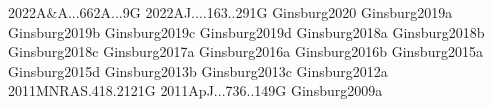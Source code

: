 \documentclass{article}
\begin{document}






















%



%

%
%
%
%
%
%
%
%
%
%
%
%
%
%
%
%
%
%
%








%

%




\nocite{biba}{2022A&A...662A...9G}
\nocite{biba}{2022AJ....163..291G}
\nocite{biba}{Ginsburg2020}
\nocite{biba}{Ginsburg2019a}
\nocite{biba}{Ginsburg2019b}
\nocite{biba}{Ginsburg2019c}
\nocite{biba}{Ginsburg2019d}
\nocite{biba}{Ginsburg2018a}
\nocite{biba}{Ginsburg2018b}
\nocite{biba}{Ginsburg2018c}
\nocite{biba}{Ginsburg2017a}
\nocite{biba}{Ginsburg2016a}
\nocite{biba}{Ginsburg2016b}
\nocite{biba}{Ginsburg2015a}
\nocite{biba}{Ginsburg2015d}
\nocite{biba}{Ginsburg2013b}
\nocite{biba}{Ginsburg2013c}
\nocite{biba}{Ginsburg2012a}
\nocite{biba}{2011MNRAS.418.2121G}
\nocite{biba}{2011ApJ...736..149G}
\nocite{biba}{Ginsburg2009a}
\end{document}
